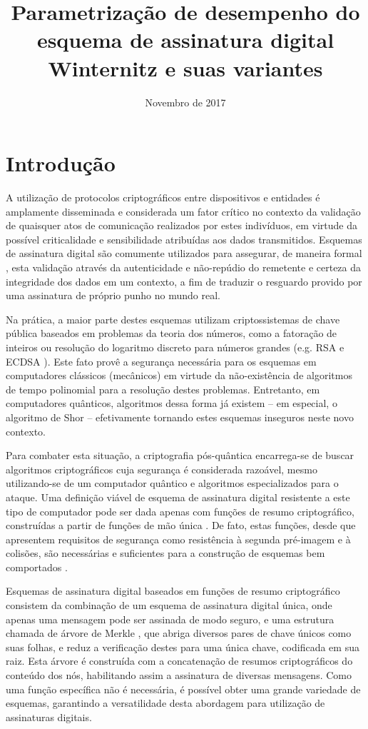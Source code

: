 \documentclass[12pt]{article}
\title{Parametrização de desempenho do esquema de
assinatura digital Winternitz e suas variantes}
\author{Novembro de 2017}
\date{}
\begin{document}
\maketitle

\section{Introdução}

A utilização de protocolos criptográficos entre dispositivos e entidades é
amplamente disseminada e considerada um fator crítico no contexto da validação
de quaisquer atos de comunicação realizados por estes indivíduos, em virtude da
possível criticalidade e sensibilidade atribuídas aos dados transmitidos.
Esquemas de assinatura digital são comumente utilizados para assegurar, de
maneira formal \cite{Goldreich:2004:FCV:975541}, esta validação através da
autenticidade e não-repúdio do remetente e certeza da integridade dos dados em
um contexto, a fim de traduzir o resguardo provido por uma assinatura de
próprio punho no mundo real.

Na prática, a maior parte destes esquemas utilizam criptossistemas de chave
pública baseados em problemas da teoria dos números, como a fatoração de
inteiros ou resolução do logaritmo discreto para números grandes (e.g. RSA
\cite{Rivest:1978:MOD:359340.359342} e ECDSA \cite{Johnson2001}). Este fato
provê a segurança necessária para os esquemas em computadores clássicos
(mecânicos) em virtude da não-existência de algoritmos de tempo polinomial para
a resolução destes problemas. Entretanto, em computadores quânticos, algoritmos
dessa forma já existem -- em especial, o algoritmo de Shor
\cite{Shor:1997:PAP:264393.264406} -- efetivamente tornando estes esquemas
inseguros neste novo contexto. 

Para combater esta situação, a criptografia pós-quântica encarrega-se de buscar
algoritmos criptográficos cuja segurança é considerada razoável, mesmo
utilizando-se de um computador quântico e algoritmos especializados para o
ataque. Uma definição viável de esquema de assinatura digital resistente a este
tipo de computador pode ser dada apenas com funções de resumo criptográfico,
construídas a partir de funções de mão única \cite{cryptoeprint:2005:328}. De
fato, estas funções, desde que apresentem requisitos de segurança como
resistência à segunda pré-imagem e à colisões, são necessárias e suficientes
para a construção de esquemas bem comportados
\cite{Rompel:1990:OFN:100216.100269}.

Esquemas de assinatura digital baseados em funções de resumo criptográfico
consistem da combinação de um esquema de assinatura digital única, onde apenas
uma mensagem pode ser assinada de modo seguro, e uma estrutura chamada de
árvore de Merkle \cite{Merkle:1989:CDS:118209.118230}, que abriga diversos
pares de chave únicos como suas folhas, e reduz a verificação destes para uma
única chave, codificada em sua raiz. Esta árvore é construída com a
concatenação de resumos criptográficos do conteúdo dos nós, habilitando assim a
assinatura de diversas mensagens. Como uma função específica não é necessária,
é possível obter uma grande variedade de esquemas, garantindo a versatilidade
desta abordagem para utilização de assinaturas digitais.
\end{document}
